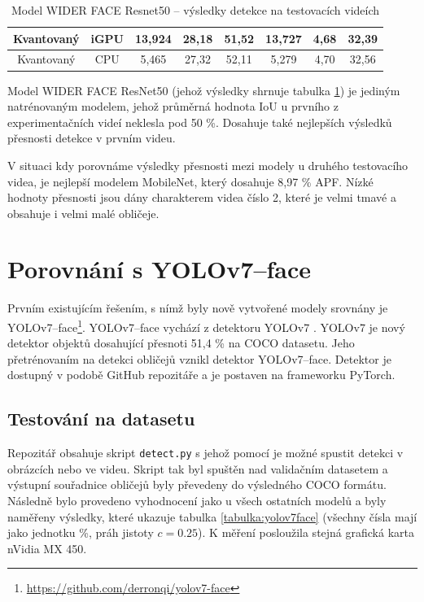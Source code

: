 \begin{table}[H]
\begin{tabular}{cc|ccc|ccc|}
  \multicolumn{1}{|c|}{\cellcolor[HTML]{E0DBDB}Kvantovaný}     & \cellcolor[HTML]{E0DBDB}iGPU & \multicolumn{1}{c|}{13,924}                                 & \multicolumn{1}{c|}{28,18}                                  & 51,52          & \multicolumn{1}{c|}{13,727}                                 & \multicolumn{1}{c|}{4,68}                                   & 32,39          \\ \hline
  \multicolumn{1}{|c|}{\cellcolor[HTML]{E0DBDB}Kvantovaný}     & \cellcolor[HTML]{E0DBDB}CPU  & \multicolumn{1}{c|}{5,465}                                  & \multicolumn{1}{c|}{27,32}                                  & 52,11          & \multicolumn{1}{c|}{5,279}                                  & \multicolumn{1}{c|}{4,70}                                   & 32,56          \\ \hline
  \end{tabular}
  \label{tabulka:wfrvidea}
  \caption{Model WIDER FACE Resnet50 -- výsledky detekce na testovacích videích}
\end{table}

Model WIDER FACE ResNet50 (jehož výsledky shrnuje tabulka \ref{tabulka:wfrvidea}) je jediným natrénovaným modelem, jehož průměrná hodnota IoU u prvního z experimentačních videí neklesla pod 50 \%. Dosahuje také nejlepších výsledků přesnosti detekce v prvním videu. 

V situaci kdy porovnáme výsledky přesnosti mezi modely u druhého testovacího videa, je nejlepší modelem MobileNet, který dosahuje 8,97 \% APF. Nízké hodnoty přesnosti jsou dány charakterem videa číslo 2, které je velmi tmavé a obsahuje i velmi malé obličeje.


\section{Porovnání s YOLOv7--face}
\label{sekce:yolov7}
Prvním existujícím řešením, s nímž byly nově vytvořené modely srovnány je YOLOv7--face\footnote{\url{https://github.com/derronqi/yolov7-face}}. YOLOv7--face vychází z detektoru YOLOv7 \cite{yolov7}. YOLOv7 je nový detektor objektů dosahující přesnoti 51,4 \% na COCO datasetu. Jeho přetrénovaním na detekci obličejů vznikl detektor YOLOv7--face. Detektor je dostupný v podobě GitHub repozitáře a je postaven na frameworku PyTorch.

\subsection*{Testování na datasetu}
Repozitář obsahuje skript \texttt{detect.py} s jehož pomocí je možné spustit detekci v obrázcích nebo ve videu. Skript tak byl spuštěn nad validačním datasetem a výstupní souřadnice obličejů byly převedeny do výsledného COCO formátu. Následně bylo provedeno vyhodnocení jako u všech ostatních modelů a byly naměřeny výsledky, které ukazuje tabulka \ref{tabulka:yolov7face} (všechny čísla mají jako jednotku \%, práh jistoty $c=0.25$). K měření posloužila stejná grafická karta nVidia MX 450.

